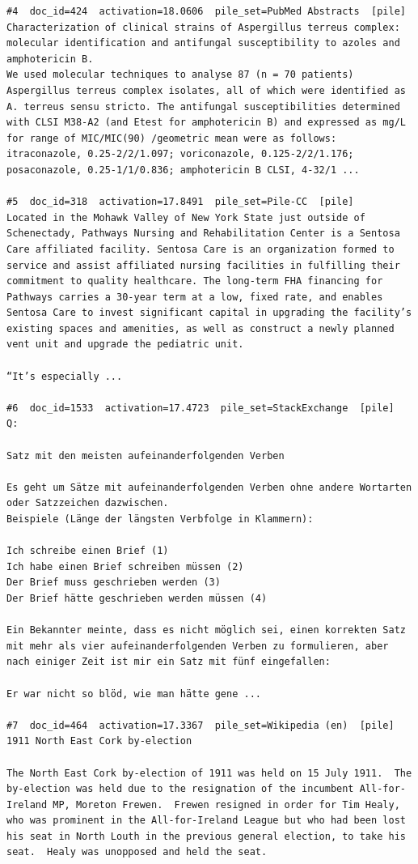 \begin{verbatim}
#4  doc_id=424  activation=18.0606  pile_set=PubMed Abstracts  [pile]
Characterization of clinical strains of Aspergillus terreus complex: molecular identification and antifungal susceptibility to azoles and amphotericin B.
We used molecular techniques to analyse 87 (n = 70 patients) Aspergillus terreus complex isolates, all of which were identified as A. terreus sensu stricto. The antifungal susceptibilities determined with CLSI M38-A2 (and Etest for amphotericin B) and expressed as mg/L for range of MIC/MIC(90) /geometric mean were as follows: itraconazole, 0.25-2/2/1.097; voriconazole, 0.125-2/2/1.176; posaconazole, 0.25-1/1/0.836; amphotericin B CLSI, 4-32/1 ...

#5  doc_id=318  activation=17.8491  pile_set=Pile-CC  [pile]
Located in the Mohawk Valley of New York State just outside of Schenectady, Pathways Nursing and Rehabilitation Center is a Sentosa Care affiliated facility. Sentosa Care is an organization formed to service and assist affiliated nursing facilities in fulfilling their commitment to quality healthcare. The long-term FHA financing for Pathways carries a 30-year term at a low, fixed rate, and enables Sentosa Care to invest significant capital in upgrading the facility’s existing spaces and amenities, as well as construct a newly planned vent unit and upgrade the pediatric unit.

“It’s especially ...

#6  doc_id=1533  activation=17.4723  pile_set=StackExchange  [pile]
Q:

Satz mit den meisten aufeinanderfolgenden Verben

Es geht um Sätze mit aufeinanderfolgenden Verben ohne andere Wortarten oder Satzzeichen dazwischen.
Beispiele (Länge der längsten Verbfolge in Klammern):

Ich schreibe einen Brief (1)
Ich habe einen Brief schreiben müssen (2)
Der Brief muss geschrieben werden (3)
Der Brief hätte geschrieben werden müssen (4)

Ein Bekannter meinte, dass es nicht möglich sei, einen korrekten Satz mit mehr als vier aufeinanderfolgenden Verben zu formulieren, aber nach einiger Zeit ist mir ein Satz mit fünf eingefallen:

Er war nicht so blöd, wie man hätte gene ...

#7  doc_id=464  activation=17.3367  pile_set=Wikipedia (en)  [pile]
1911 North East Cork by-election

The North East Cork by-election of 1911 was held on 15 July 1911.  The by-election was held due to the resignation of the incumbent All-for-Ireland MP, Moreton Frewen.  Frewen resigned in order for Tim Healy, who was prominent in the All-for-Ireland League but who had been lost his seat in North Louth in the previous general election, to take his seat.  Healy was unopposed and held the seat.


\end{verbatim}
